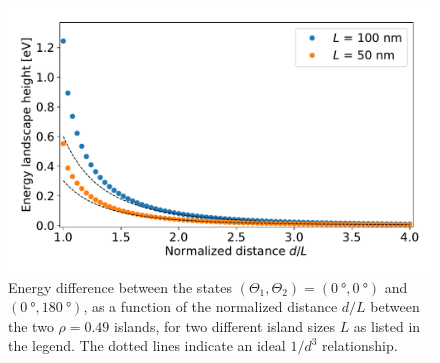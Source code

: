 \documentclass[11pt,a4paper,english]{article}
\begin{document}
\begin{figure}[hb!]
    \centering
    \includegraphics[width=0.63\columnwidth]{Figures/two_islands/EnergyBarrier/dist1-4L_r0.49_s100&50_4nm&2nm.pdf}
    \caption{Energy difference between the states $(\Theta_1, \Theta_2) = (\SI{0}{\degree}, \SI{0}{\degree})$ and $(\SI{0}{\degree}, \SI{180}{\degree})$, as a function of the normalized distance $d/L$ between the two $\rho=0.49$ islands, for two different island sizes $L$ as listed in the legend. The dotted lines indicate an ideal $1/d^3$ relationship.}
    \label{fig:two-islands_barrier}
\end{figure}

\clearpage
\end{document}
